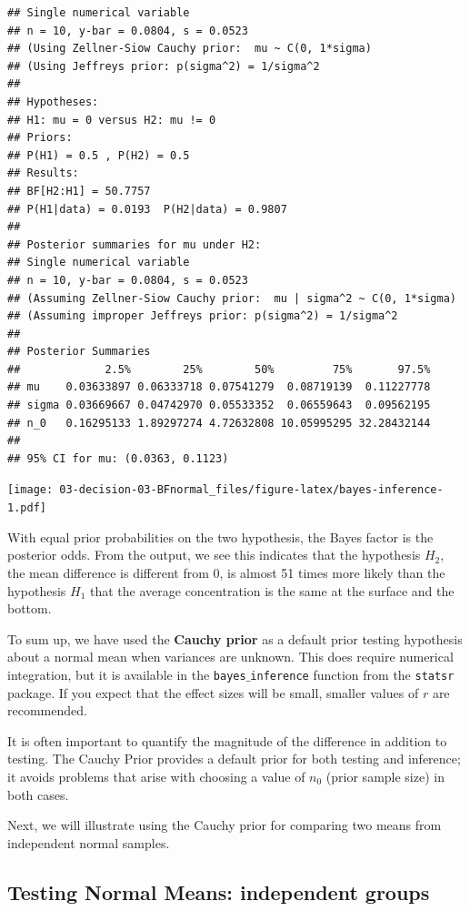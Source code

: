 \documentclass[]{book}
\theoremstyle{definition}
\theoremstyle{definition}
\theoremstyle{definition}
\theoremstyle{remark}
\begin{document}
\begin{verbatim}
## Single numerical variable
## n = 10, y-bar = 0.0804, s = 0.0523
## (Using Zellner-Siow Cauchy prior:  mu ~ C(0, 1*sigma)
## (Using Jeffreys prior: p(sigma^2) = 1/sigma^2
## 
## Hypotheses:
## H1: mu = 0 versus H2: mu != 0
## Priors:
## P(H1) = 0.5 , P(H2) = 0.5
## Results:
## BF[H2:H1] = 50.7757
## P(H1|data) = 0.0193  P(H2|data) = 0.9807 
## 
## Posterior summaries for mu under H2:
## Single numerical variable
## n = 10, y-bar = 0.0804, s = 0.0523
## (Assuming Zellner-Siow Cauchy prior:  mu | sigma^2 ~ C(0, 1*sigma)
## (Assuming improper Jeffreys prior: p(sigma^2) = 1/sigma^2
## 
## Posterior Summaries
##             2.5%        25%        50%         75%       97.5%
## mu    0.03633897 0.06333718 0.07541279  0.08719139  0.11227778
## sigma 0.03669667 0.04742970 0.05533352  0.06559643  0.09562195
## n_0   0.16295133 1.89297274 4.72632808 10.05995295 32.28432144
## 
## 95% CI for mu: (0.0363, 0.1123)
\end{verbatim}

\texttt{[image: 03-decision-03-BFnormal\_files/figure-latex/bayes-inference-1.pdf]}

With equal prior probabilities on the two hypothesis, the Bayes factor
is the posterior odds. From the output, we see this indicates that the
hypothesis \(H_2\), the mean difference is different from 0, is almost
51 times more likely than the hypothesis \(H_1\) that the average
concentration is the same at the surface and the bottom.

To sum up, we have used the \textbf{Cauchy prior} as a default prior
testing hypothesis about a normal mean when variances are unknown. This
does require numerical integration, but it is available in the
\texttt{bayes$\_$inference} function from the \texttt{statsr} package.
If you expect that the effect sizes will be small, smaller values of
\(r\) are recommended.

It is often important to quantify the magnitude of the difference in
addition to testing. The Cauchy Prior provides a default prior for both
testing and inference; it avoids problems that arise with choosing a
value of \(n_0\) (prior sample size) in both cases.

Next, we will illustrate using the Cauchy prior for comparing two means
from independent normal samples.

\subsection{Testing Normal Means: independent
groups}\label{testing-normal-means-independent-groups}
\end{document}
